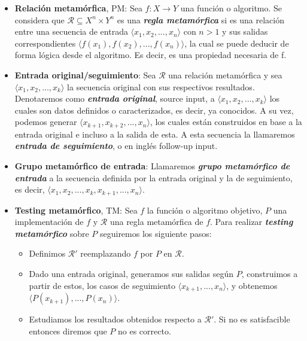 \begin{itemize}
    \item \textbf{Relación metamórfica}, PM: Sea $f: X \rightarrow Y$ una función o algoritmo. Se considera que $\mathscr{R} \subseteq X^{n} \times Y^{n}$ es una \textbf{\textit{regla metamórfica}} si es una relación entre una secuencia de entrada $\langle x_{1},x_{2},...,x_{n}\rangle$ con $n>1$ y sus salidas correspondientes $\langle f(x_{1}),f(x_{2}),...,f(x_{n})\rangle$, la cual se puede deducir de forma lógica desde el algoritmo. Es decir, es una propiedad necesaria de f.
    \item \textbf{Entrada original/seguimiento}: Sea $\mathscr{R}$ una relación metamórfica y sea $\langle x_{1},x_{2},...,x_{k}\rangle$ la secuencia original con sus respectivos resultados. Denotaremos como \textbf{\textit{entrada original}}, source input, a   $\langle x_{1},x_{2},...,x_{k}\rangle$  los cuales son datos definidos o caracterizados, es decir, ya conocidos. A su vez, podemos generar $\langle x_{k+1},x_{k+2},...,x_{n}\rangle$, los cuales están construidos en base a la entrada original e incluso a la salida de esta. A esta secuencia la llamaremos \textbf{\textit{entrada de seguimiento}}, o en inglés follow-up input.
    \item \textbf{Grupo metamórfico de entrada}: Llamaremos \textbf{\textit{grupo metamórfico de entrada}} a la secuencia definida por la entrada original y la de seguimiento, es decir, $\langle x_{1},x_{2},...,x_{k},x_{k+1},...,x_{n}\rangle$.
    \item \textbf{Testing metamórfico}, TM: Sea $f$ la función o algoritmo objetivo, $P$ una implementación de $f$ y $\mathscr{R}$ una regla metamórfica de $f$. Para realizar \textbf{\textit{testing metamórfico}} sobre $P$ seguiremos los siguiente pasos:
    \begin{itemize}
        \item Definimos $\mathscr{R}'$ reemplazando $f$ por $P$ en $\mathscr{R}$.
        \item Dado una entrada original, generamos sus salidas según $P$, construimos a partir de estos, los casos de seguimiento $\langle x_{k+1},...,x_{n}\rangle$, y obtenemos $\langle P(x_{k+1}),...,P(x_{n})\rangle$.
        \item Estudiamos los resultados obtenidos respecto a $\mathscr{R}'$. Si no es satisfacible entonces diremos que $P$ no es correcto.
    \end{itemize}
\end{itemize}

